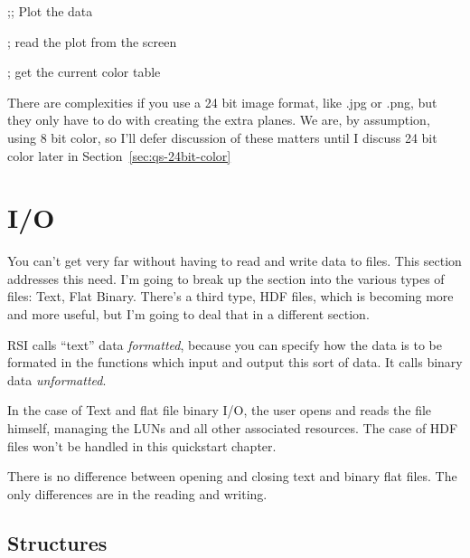   ;; Plot the data


   ; read the plot from the screen

   ; get the current color table


  There are complexities if you use a 24 bit image format, like .jpg
  or .png, but they only have to do with creating the extra planes. We
  are, by assumption, using 8 bit color, so I'll defer discussion of
  these matters until I discuss 24 bit color later in
  Section~\ref{sec:qs-24bit-color}

\section{I/O}\label{sec:qs-I/O}
  
  You can't get very far without having to read and write data to
  files. This section addresses this need. I'm going to break up the
  section into the various types of files: Text, Flat Binary. There's
  a third type, HDF files, which is becoming more and more useful, but
  I'm going to deal that in a different section.

  RSI calls ``text'' data \textit{formatted}, because you can specify
  how the data is to be formated in the functions which input and
  output this sort of data. It calls binary data \textit{unformatted}.


  In the case of Text and flat file binary I/O, the user opens and
  reads the file himself, managing the LUNs and all other associated
  resources. The case of HDF files won't be handled in this quickstart
  chapter.

  There is no difference between opening and closing text and binary
  flat files. The only differences are in the reading and writing.

\subsection{Structures}\label{sec:qs-Structures}

